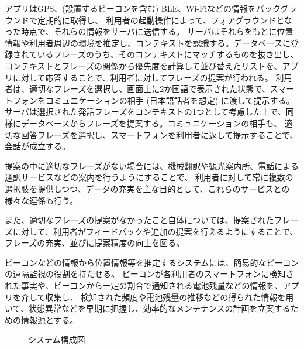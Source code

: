 \documentclass[11pt,papersize]{jsbook}
\begin{document}
アプリはGPS、(設置するビーコンを含む) BLE、Wi-Fiなどの情報をバックグラウンドで定期的に取得し、
利用者の起動操作によって、フォアグラウンドとなった時点で、それらの情報をサーバに送信する。
サーバはそれらをもとに位置情報や利用者周辺の環境を推定し、コンテキストを認識する。データベースに登録されているフレーズのうち、そのコンテキストにマッチするものを抜き出し、
コンテキストとフレーズの関係から優先度を計算して並び替えたリストを、アプリに対して応答することで、利用者に対してフレーズの提案が行われる。
利用者は、適切なフレーズを選択し、画面上に2か国語で表示された状態で、スマートフォンをコミュニケーションの相手 (日本語話者を想定) に渡して提示する。
サーバは選択された発話フレーズをコンテキストの1つとして考慮した上で、同様にデータベースからフレーズを提案する。コミュニケーションの相手も、
適切な回答フレーズを選択し、スマートフォンを利用者に返して提示することで、会話が成立する。

提案の中に適切なフレーズがない場合には、機械翻訳や観光案内所、電話による通訳サービスなどの案内を行うようにすることで、
利用者に対して常に複数の選択肢を提供しつつ、データの充実を主な目的として、これらのサービスとの様々な連係も行う。

また、適切なフレーズの提案がなかったこと自体については、提案されたフレーズに対して、利用者がフィードバックや追加の提案を行えるようにすることで、
フレーズの充実、並びに提案精度の向上を図る。

ビーコンなどの情報から位置情報等を推定するシステムには、簡易的なビーコンの遠隔監視の役割を持たせる。
ビーコンが各利用者のスマートフォンに検知された事実や、ビーコンから一定の割合で通知される電池残量などの情報を、アプリを介して収集し、
検知された頻度や電池残量の推移などの得られた情報を用いて、状態異常などを早期に把握し、効率的なメンテナンスの計画を立案するための情報源とする。
\begin{figure}[htbp]
 \begin{center}
 \end{center}
 \caption{システム構成図}
 \label{fig:system_structure}
\end{figure}
\end{document}
